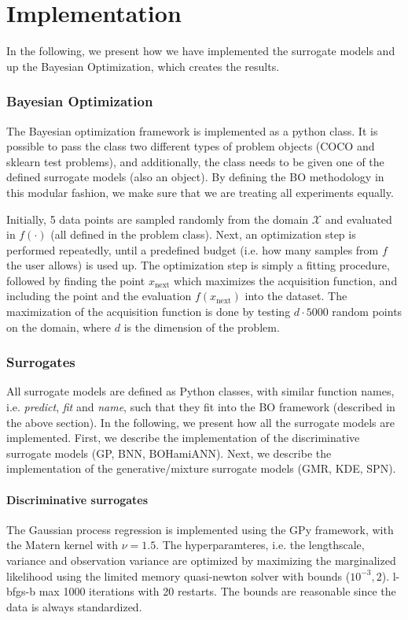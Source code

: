 \chapter{Implementation}
In the following, we present how we have implemented the surrogate models and up the Bayesian Optimization, 
which creates the results.

\subsection{Bayesian Optimization}
The Bayesian optimization framework is implemented as a python class. It is possible to pass the class two
different types of problem objects (COCO and sklearn test problems), and additionally, the class
needs to be given one of the defined surrogate models (also an object). By defining the BO methodology
in this modular fashion, we make sure that we are treating all experiments equally. 

Initially, 5 data points are sampled randomly from the domain $\mathcal{X}$ and evaluated in $f(\cdot)$ (all 
defined in the problem class). Next, an optimization step is performed repeatedly, until a predefined budget (i.e. 
how many samples from $f$ the user allows) is used up. The optimization step is simply a fitting procedure, 
followed by finding the point $x_{\text{next}}$ which maximizes the acquisition function, and
including the point and the evaluation $f(x_{\text{next}})$ into the dataset. The maximization of the acquisition
function is done by testing $d\cdot 5000$ random points on the domain, where $d$ is the dimension of the problem. 

\subsection{Surrogates}
All surrogate models are defined as Python classes, with similar function names, i.e.
\textit{predict}, \textit{fit} and \textit{name}, such that they fit into the BO framework
(described in the above section). In the following, we present how all the surrogate models are
implemented. First, we describe the implementation of the discriminative surrogate models (GP, BNN, BOHamiANN). Next,  
we describe the implementation of the generative/mixture surrogate models (GMR, KDE, SPN). 

\subsubsection{Discriminative surrogates}
The Gaussian process regression is implemented using the GPy framework, with the Matern kernel with
$\nu=1.5$. The hyperparamteres, i.e. the lengthscale, variance and observation variance are
optimized by maximizing the marginalized likelihood using the limited memory quasi-newton solver
with bounds ($10^{-3}, 2$). l-bfgs-b max 1000 iterations with 20 restarts. 
The bounds are reasonable since the data is always standardized. 


